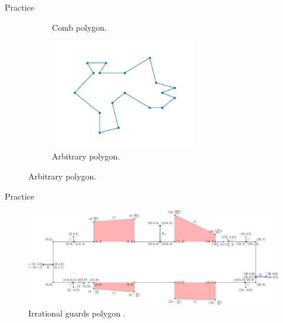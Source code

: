 \documentclass{beamer}
\begin{document}
\begin{frame}{Practice}
\begin{figure}[h!]
\begin{subfigure}{0.45\textwidth}
			\caption{Comb polygon.}
			\label{fig:comb}
		\end{subfigure}
		\begin{subfigure}{0.45\textwidth}
			\centering
			\includegraphics[width = 0.7\textwidth]{Images/random.png}
			\caption{Arbitrary polygon.}
			\label{fig:random}
		\end{subfigure}
	\end{figure}
\end{frame}

\begin{frame}{Practice}
	\begin{figure}
		\centering
		\includegraphics[width = \textwidth]{Images/fig-12-1.png}
		\caption{Irrational guards polygon \cite{abrahamsen2021art}.}
	\end{figure}
\end{frame}
\end{document}
